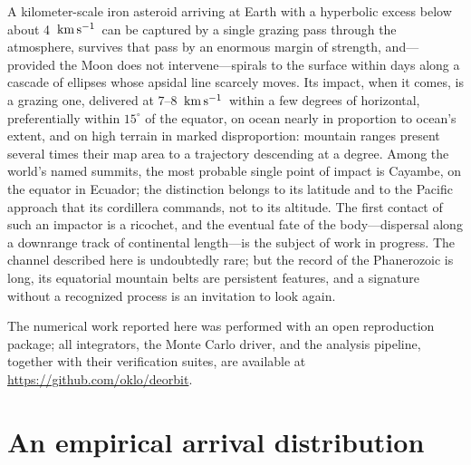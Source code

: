 \documentclass[twocolumn]{aastex701}
\newcommand{\kms}{\ensuremath{{\rm \,km\,s^{-1}}}}
\begin{document}
A kilometer-scale iron asteroid arriving at Earth with a hyperbolic excess
below about 4 \kms\ can be captured by a single grazing pass through the
atmosphere, survives that pass by an enormous margin of strength, and---
provided the Moon does not intervene---spirals to the surface within days
along a cascade of ellipses whose apsidal line scarcely moves. Its impact,
when it comes, is a grazing one, delivered at 7--8 \kms\ within a few
degrees of horizontal, preferentially within $15^{\circ}$ of the equator,
on ocean nearly in proportion to ocean's extent, and on high terrain in
marked disproportion: mountain ranges present several times their map
area to a trajectory descending at a degree. Among the world's named
summits, the most probable single point of impact is Cayambe, on the
equator in Ecuador; the distinction belongs to its latitude and to the
Pacific approach that its cordillera commands, not to its altitude. The
first contact of such an impactor is a ricochet, and the eventual fate of
the body---dispersal along a downrange track of continental length---is
the subject of work in progress. The channel described here is
undoubtedly rare; but the record of the Phanerozoic is long, its
equatorial mountain belts are persistent features, and a signature
without a recognized process is an invitation to look again.

\begin{acknowledgments}
The numerical work reported here was performed with an open reproduction
package; all integrators, the Monte Carlo driver, and the analysis
pipeline, together with their verification suites, are available at
\url{https://github.com/oklo/deorbit}.
\end{acknowledgments}

\appendix

\section{An empirical arrival distribution} \label{app:prior}
\end{document}
